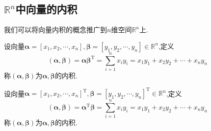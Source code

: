 \documentclass[9pt,a4paper]{book}
\begin{document}
\subsection{$ \mathbb{R}^n $中向量的内积}
我们可以将向量内积的概念推广到$ n $维空间$ \mathbb{R}^n $上.
\begin{defination}[行向量内积的定义]
	设向量$ \bm{\alpha}=[x_1,x_2,\cdots,x_n],\bm{\beta}=[y_1,y_2,\cdots,y_n]\in\mathbb{R}^n $,定义
	\[
	(\bm{\alpha},\bm{\beta})=\bm{\alpha}\bm{\beta}^{\mathrm{T}}=\sum_{i=1}^n{x_iy_i}=x_1y_1+x_2y_2+\cdots+x_ny_n
	\]
	称$ (\bm{\alpha},\bm{\beta}) $为$ \bm{\alpha},\bm{\beta} $的内积.
\end{defination}
\begin{defination}[列向量内积的定义]
	设向量$ \bm{\alpha}=[x_1,x_2,\cdots,x_n]^{\mathrm{T}},\bm{\beta}=[y_1,y_2,\cdots,y_n]^{\mathrm{T}}\in\mathbb{R}^n $,定义
	\[
	(\bm{\alpha},\bm{\beta})=\bm{\alpha}^{\mathrm{T}}\bm{\beta}=\sum_{i=1}^n{x_iy_i}=x_1y_1+x_2y_2+\cdots+x_ny_n
	\]
	称$ (\bm{\alpha},\bm{\beta}) $为$ \bm{\alpha},\bm{\beta} $的内积.
\end{defination}
\end{document}
